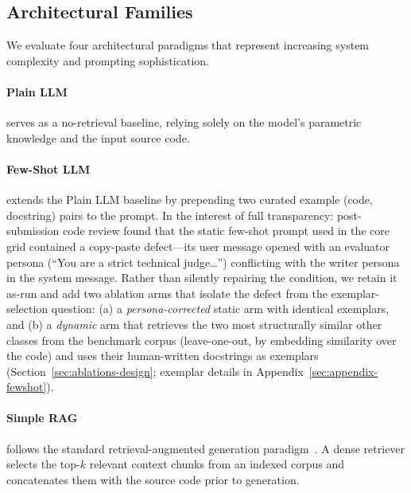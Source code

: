 \documentclass[pdflatex,sn-mathphys-ay]{sn-jnl}%
\theoremstyle{thmstyleone}%
\theoremstyle{thmstyletwo}%
\theoremstyle{thmstylethree}%
\begin{document}
\subsection{Architectural Families}
We evaluate four architectural paradigms that represent increasing system complexity and prompting sophistication.
\paragraph{Plain LLM} serves as a no-retrieval baseline, relying solely on the model's parametric knowledge and the input source code.
\paragraph{Few-Shot LLM} extends the Plain LLM baseline by prepending two curated example (code, docstring) pairs to the prompt. In the interest of full transparency: post-submission code review found that the static few-shot prompt used in the core grid contained a copy-paste defect---its user message opened with an evaluator persona (``You are a strict technical judge\ldots'') conflicting with the writer persona in the system message. Rather than silently repairing the condition, we retain it as-run and add two ablation arms that isolate the defect from the exemplar-selection question: (a) a \emph{persona-corrected} static arm with identical exemplars, and (b) a \emph{dynamic} arm that retrieves the two most structurally similar other classes from the benchmark corpus (leave-one-out, by embedding similarity over the code) and uses their human-written docstrings as exemplars (Section~\ref{sec:ablations-design}; exemplar details in Appendix~\ref{sec:appendix-fewshot}).
\paragraph{Simple RAG} follows the standard retrieval-augmented generation paradigm~\cite{Lewis2020}. A dense retriever selects the top-$k$ relevant context chunks from an indexed corpus and concatenates them with the source code prior to generation.
\end{document}
